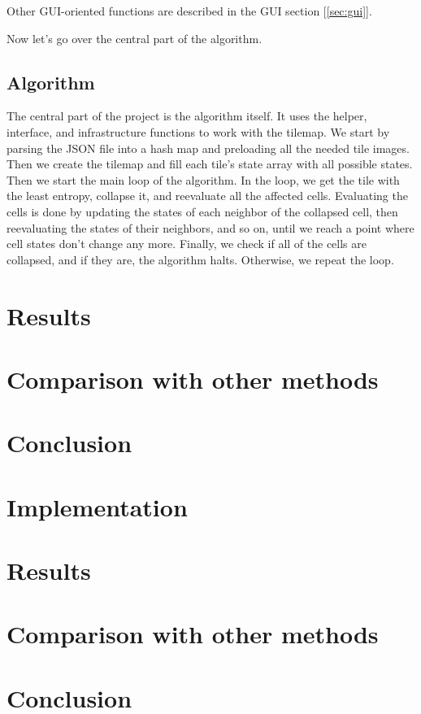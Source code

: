 \documentclass[10pt,twoside,a4paper]{article}
\begin{document}
Other GUI-oriented functions are described in the GUI section [\ref*{sec:gui}].

Now let's go over the central part of the algorithm.


\subsection{Algorithm}\label{sec:algorithm}
The central part of the project is the algorithm itself.
It uses the helper, interface, and infrastructure functions to work with the tilemap.
We start by parsing the JSON file into a hash map and preloading all the needed tile images.
Then we create the tilemap and fill each tile's state array with all possible states.
Then we start the main loop of the algorithm.
In the loop, we get the tile with the least entropy, collapse it, and reevaluate all the affected cells.
Evaluating the cells is done by updating the states of each neighbor of the collapsed cell, then reevaluating the states of their neighbors, and so on, until we reach a point where cell states don't change any more.
Finally, we check if all of the cells are collapsed, and if they are, the algorithm halts.
Otherwise, we repeat the loop.

\section{Results}\label{sec:results}
\section{Comparison with other methods}\label{sec:comparison}
\section{Conclusion}\label{sec:conclusion}
\cite{BL22}
\cite{CHF20}
\cite{KLL+19}
\cite{LRGC22}
\cite{NMBP20}
\section{Implementation}\label{sec:implementation}
\section{Results}\label{sec:results}
\section{Comparison with other methods}\label{sec:comparison}
\section{Conclusion}\label{sec:conclusion}



\end{document}
